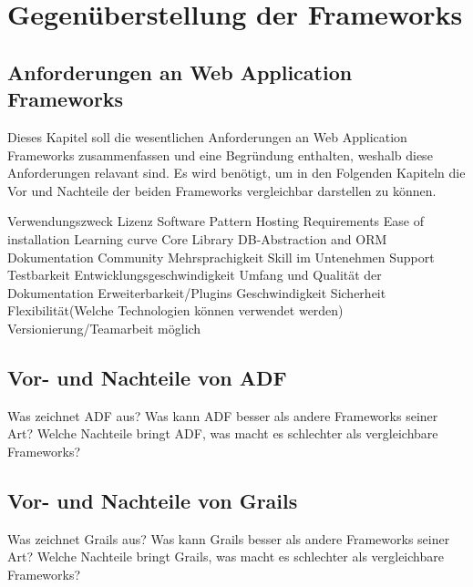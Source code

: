 \section{Gegenüberstellung der Frameworks}
\subsection{Anforderungen an Web Application Frameworks}
Dieses Kapitel soll die wesentlichen Anforderungen an Web Application Frameworks zusammenfassen und eine Begründung enthalten, weshalb diese Anforderungen relavant sind. Es wird benötigt, um in den Folgenden Kapiteln die Vor und Nachteile der beiden Frameworks vergleichbar darstellen zu können.

Verwendungszweck
Lizenz
Software Pattern
Hosting Requirements
Ease of installation
Learning curve
Core Library
DB-Abstraction and ORM
Dokumentation
Community
Mehrsprachigkeit
Skill im Untenehmen
Support
Testbarkeit
Entwicklungsgeschwindigkeit
Umfang und Qualität der Dokumentation
Erweiterbarkeit/Plugins
Geschwindigkeit Sicherheit
Flexibilität(Welche Technologien können verwendet werden)
Versionierung/Teamarbeit möglich

\subsection{Vor- und Nachteile von ADF}
Was zeichnet ADF aus? Was kann ADF besser als andere Frameworks seiner Art?
Welche Nachteile bringt ADF, was macht es schlechter als vergleichbare Frameworks?
\subsection{Vor- und Nachteile von Grails}
Was zeichnet Grails aus? Was kann Grails besser als andere Frameworks seiner Art?
Welche Nachteile bringt Grails, was macht es schlechter als vergleichbare Frameworks?
